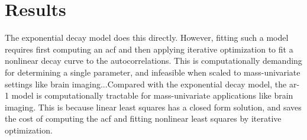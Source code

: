 \documentclass[latex/main.tex]{subfiles}
\begin{document}
\section{Results}

The exponential decay model  does this directly. However, fitting such a model requires first computing an acf and then applying iterative optimization to fit a nonlinear decay curve to the autocorrelations. This is computationally demanding for determining a single parameter, and infeasible when scaled to mass-univariate settings like brain imaging...Compared with the exponential decay model, the ar-1 model is computationally tractable for mass-univariate applications like brain imaging. This is because linear least squares has a closed form solution, and saves the cost of computing the acf and fitting nonlinear least squares by iterative optimization.
\end{document}
